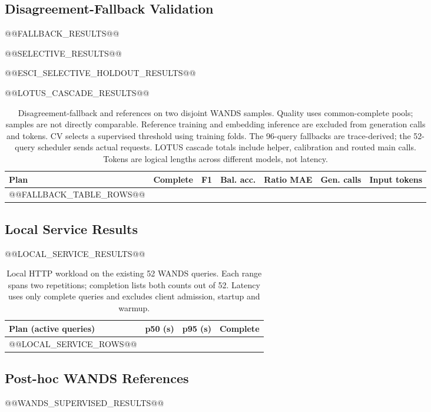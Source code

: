 \documentclass[conference]{IEEEtran}
\begin{document}
\subsection{Disagreement-Fallback Validation}
@@FALLBACK_RESULTS@@

@@SELECTIVE_RESULTS@@

@@ESCI_SELECTIVE_HOLDOUT_RESULTS@@

@@LOTUS_CASCADE_RESULTS@@

\begin{table}[t]
\caption{Disagreement-fallback and references on two disjoint WANDS samples. Quality uses common-complete pools; samples are not directly comparable. Reference training and embedding inference are excluded from generation calls and tokens. CV selects a supervised threshold using training folds. The 96-query fallbacks are trace-derived; the 52-query scheduler sends actual requests. LOTUS cascade totals include helper, calibration and routed main calls. Tokens are logical lengths across different models, not latency.}
\label{tab:fallback}
\centering\small
\begin{tabular}{lrrrrrr}
\toprule
Plan & Complete & F1 & Bal. acc. & Ratio MAE & Gen. calls & Input tokens \\
\midrule
@@FALLBACK_TABLE_ROWS@@
\bottomrule
\end{tabular}
\end{table}

\subsection{Local Service Results}
@@LOCAL_SERVICE_RESULTS@@

\begin{table}[t]
\caption{Local HTTP workload on the existing 52 WANDS queries. Each range spans two repetitions; completion lists both counts out of 52. Latency uses only complete queries and excludes client admission, startup and warmup.}
\label{tab:local_service}
\centering\footnotesize
\begin{tabular}{lrrr}
\toprule
Plan (active queries) & p50 (s) & p95 (s) & Complete \\
\midrule
@@LOCAL_SERVICE_ROWS@@
\bottomrule
\end{tabular}
\end{table}

\subsection{Post-hoc WANDS References}
@@WANDS_SUPERVISED_RESULTS@@
\end{document}
